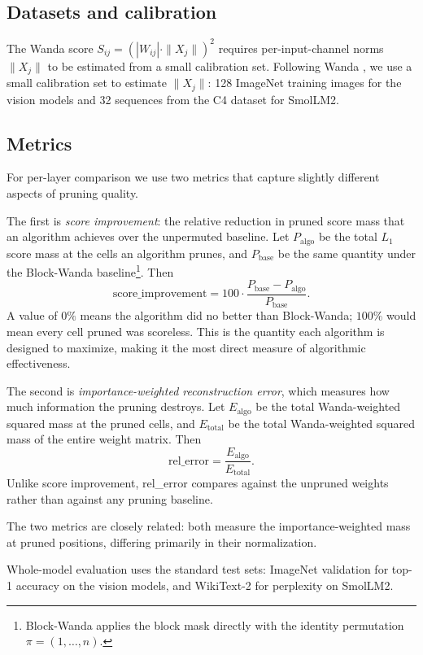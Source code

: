 \subsection*{Datasets and calibration}

The Wanda score $S_{ij} = (|W_{ij}| \cdot \|X_j\|)^2$ requires per-input-channel norms $\|X_j\|$ to be estimated from a small calibration set. Following Wanda \cite{wanda}, we use a small calibration set to estimate $\|X_j\|$: 128 ImageNet training images for the vision models and 32 sequences from the C4 dataset \cite{raffel2023exploringlimitstransferlearning} for SmolLM2.

\subsection*{Metrics}

For per-layer comparison we use two metrics that capture slightly different aspects of pruning quality.

The first is \emph{score improvement}: the relative reduction in pruned score mass that an algorithm achieves over the unpermuted baseline. Let $P_{\mathrm{algo}}$ be the total $L_1$ score mass at the cells an algorithm prunes, and $P_{\mathrm{base}}$ be the same quantity under the Block-Wanda baseline\footnote{Block-Wanda applies the block mask directly with the identity permutation $\pi = (1, \ldots, n)$.}. Then
$$
\mathrm{score\_improvement} = 100 \cdot \frac{P_{\mathrm{base}} - P_{\mathrm{algo}}}{P_{\mathrm{base}}}.
$$
A value of $0\%$ means the algorithm did no better than Block-Wanda; $100\%$ would mean every cell pruned was scoreless. This is the quantity each algorithm is designed to maximize, making it the most direct measure of algorithmic effectiveness.

The second is \emph{importance-weighted reconstruction error}, which measures how much information the pruning destroys. Let $E_{\mathrm{algo}}$ be the total Wanda-weighted squared mass at the pruned cells, and $E_{\mathrm{total}}$ be the total Wanda-weighted squared mass of the entire weight matrix. Then
$$
\mathrm{rel\_error} = \frac{E_{\mathrm{algo}}}{E_{\mathrm{total}}}.
$$
Unlike score improvement, rel\_error compares against the unpruned weights rather than against any pruning baseline.

The two metrics are closely related: both measure the importance-weighted mass at pruned positions, differing primarily in their normalization.

Whole-model evaluation uses the standard test sets: ImageNet validation \cite{imagenet15russakovsky} for top-1 accuracy on the vision models, and WikiText-2 \cite{merity2016pointer} for perplexity on SmolLM2.

